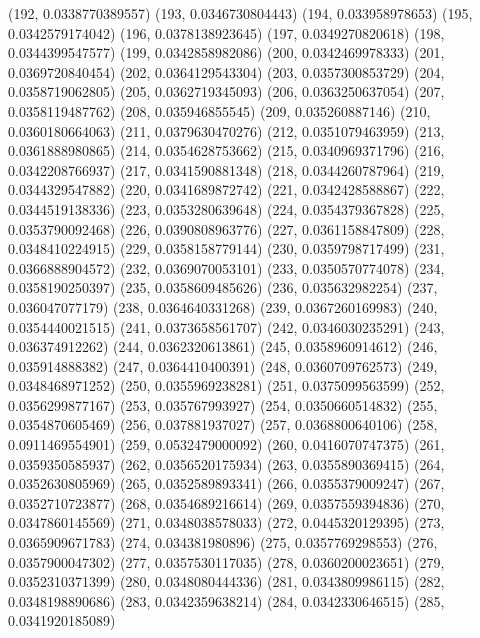 {					(192, 0.0338770389557)
					(193, 0.0346730804443)
					(194, 0.033958978653)
					(195, 0.0342579174042)
					(196, 0.0378138923645)
					(197, 0.0349270820618)
					(198, 0.0344399547577)
					(199, 0.0342858982086)
					(200, 0.0342469978333)
					(201, 0.0369720840454)
					(202, 0.0364129543304)
					(203, 0.0357300853729)
					(204, 0.0358719062805)
					(205, 0.0362719345093)
					(206, 0.0363250637054)
					(207, 0.0358119487762)
					(208, 0.035946855545)
					(209, 0.035260887146)
					(210, 0.0360180664063)
					(211, 0.0379630470276)
					(212, 0.0351079463959)
					(213, 0.0361888980865)
					(214, 0.0354628753662)
					(215, 0.0340969371796)
					(216, 0.0342208766937)
					(217, 0.0341590881348)
					(218, 0.0344260787964)
					(219, 0.0344329547882)
					(220, 0.0341689872742)
					(221, 0.0342428588867)
					(222, 0.0344519138336)
					(223, 0.0353280639648)
					(224, 0.0354379367828)
					(225, 0.0353790092468)
					(226, 0.0390808963776)
					(227, 0.0361158847809)
					(228, 0.0348410224915)
					(229, 0.0358158779144)
					(230, 0.0359798717499)
					(231, 0.0366888904572)
					(232, 0.0369070053101)
					(233, 0.0350570774078)
					(234, 0.0358190250397)
					(235, 0.0358609485626)
					(236, 0.035632982254)
					(237, 0.036047077179)
					(238, 0.0364640331268)
					(239, 0.0367260169983)
					(240, 0.0354440021515)
					(241, 0.0373658561707)
					(242, 0.0346030235291)
					(243, 0.036374912262)
					(244, 0.0362320613861)
					(245, 0.0358960914612)
					(246, 0.035914888382)
					(247, 0.0364410400391)
					(248, 0.0360709762573)
					(249, 0.0348468971252)
					(250, 0.0355969238281)
					(251, 0.0375099563599)
					(252, 0.0356299877167)
					(253, 0.035767993927)
					(254, 0.0350660514832)
					(255, 0.0354870605469)
					(256, 0.037881937027)
					(257, 0.0368800640106)
					(258, 0.0911469554901)
					(259, 0.0532479000092)
					(260, 0.0416070747375)
					(261, 0.0359350585937)
					(262, 0.0356520175934)
					(263, 0.0355890369415)
					(264, 0.0352630805969)
					(265, 0.0352589893341)
					(266, 0.0355379009247)
					(267, 0.0352710723877)
					(268, 0.0354689216614)
					(269, 0.0357559394836)
					(270, 0.0347860145569)
					(271, 0.0348038578033)
					(272, 0.0445320129395)
					(273, 0.0365909671783)
					(274, 0.034381980896)
					(275, 0.0357769298553)
					(276, 0.0357900047302)
					(277, 0.0357530117035)
					(278, 0.0360200023651)
					(279, 0.0352310371399)
					(280, 0.0348080444336)
					(281, 0.0343809986115)
					(282, 0.0348198890686)
					(283, 0.0342359638214)
					(284, 0.0342330646515)
					(285, 0.0341920185089)
}
